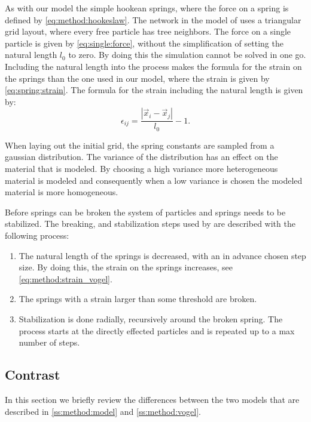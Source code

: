 As with our model the simple hookean springs, where the force on a spring is defined by \cref{eq:method:hookeslaw}. The network in the model of \citeauthor{vogel2005studies2} uses a triangular grid layout, where every free particle has tree neighbors. The force on a single particle is given by \cref{eq:single:force}, without the simplification of setting the natural length $l_0$ to zero. By doing this the simulation cannot be solved in one go. Including the natural length into the process makes the formula for the strain on the springs than the one used in our model, where the strain is given by \cref{eq:spring:strain}. The formula for the strain including the natural length is given by:
%
\begin{equation}\label{eq:method:strain_vogel}
	\epsilon_{ij} = \frac{|\vec{x}_i - \vec{x}_j|}{l_0} - 1.
\end{equation}

When laying out the initial grid, the spring constants are sampled from a gaussian distribution. The variance of the distribution has an effect on the material that is modeled. By choosing a high variance more heterogeneous material is modeled and consequently when a low variance is chosen the modeled material is more homogeneous.

Before springs can be broken the system of particles and springs needs to be stabilized. The breaking, and stabilization steps used by \citeauthor{vogel2005studies2} are described with the following process:
\begin{enumerate}
	\item The natural length of the springs is decreased, with an in advance chosen step size. By doing this, the strain on the springs increases, see \cref{eq:method:strain_vogel}.
	\item The springs with a strain larger than some threshold are broken.
	\item Stabilization is done radially, recursively around the broken spring. The process starts at the directly effected particles and is repeated up to a max number of steps. 
\end{enumerate}

\subsection{Contrast}\label{ss:method:contrast}

In this section we briefly review the differences between the two models that are described in \cref{ss:method:model} and \cref{ss:method:vogel}. 

